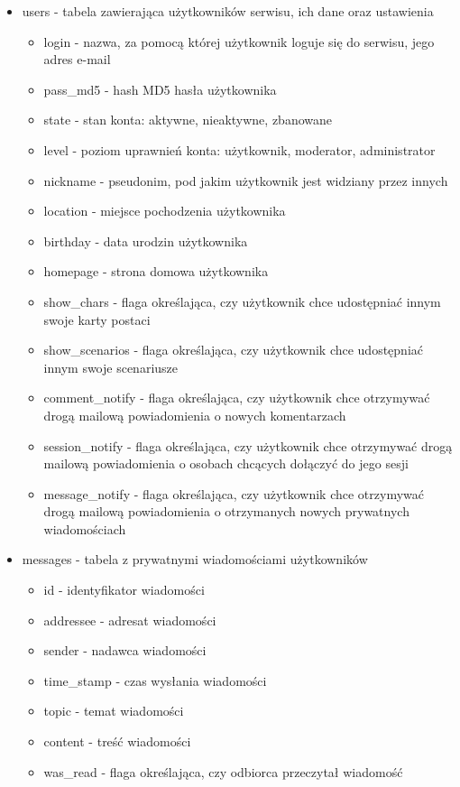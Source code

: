 \begin{itemize}
\item users - tabela zawierająca użytkowników serwisu, ich dane oraz ustawienia
	\begin{itemize}
	\item login - nazwa, za pomocą której użytkownik loguje się do serwisu, jego adres e-mail
	\item pass\_md5 - hash MD5 hasła użytkownika
	\item state - stan konta: aktywne, nieaktywne, zbanowane
	\item level - poziom uprawnień konta: użytkownik, moderator, administrator
	\item nickname - pseudonim, pod jakim użytkownik jest widziany przez innych
	\item location - miejsce pochodzenia użytkownika
	\item birthday - data urodzin użytkownika
	\item homepage - strona domowa użytkownika
	\item show\_chars - flaga określająca, czy użytkownik chce udostępniać innym swoje karty postaci
	\item show\_scenarios - flaga określająca, czy użytkownik chce udostępniać innym swoje scenariusze
	\item comment\_notify - flaga określająca, czy użytkownik chce otrzymywać drogą mailową powiadomienia o nowych komentarzach
	\item session\_notify - flaga określająca, czy użytkownik chce otrzymywać drogą mailową powiadomienia o osobach chcących dołączyć do jego sesji
	\item message\_notify - flaga określająca, czy użytkownik chce otrzymywać drogą mailową powiadomienia o otrzymanych nowych prywatnych wiadomościach
	\end{itemize}
\item messages - tabela z prywatnymi wiadomościami użytkowników
	\begin{itemize}
	\item id - identyfikator wiadomości
	\item addressee - adresat wiadomości
	\item sender - nadawca wiadomości
	\item time\_stamp - czas wysłania wiadomości
	\item topic - temat wiadomości
	\item content - treść wiadomości
	\item was\_read - flaga określająca, czy odbiorca przeczytał wiadomość

\end{itemize}
\end{itemize}
